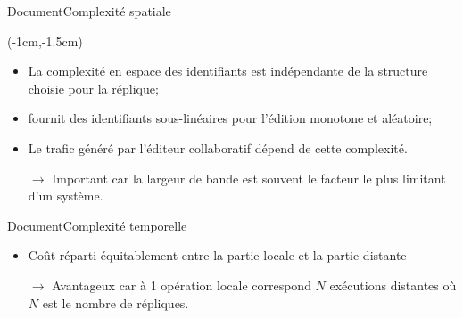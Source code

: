 \begin{frame}{Document}{Complexité spatiale}
  \vspace{1cm}
  
  \begin{textblock*}{\textwidth}(-1cm,-1.5cm) 
    \begin{table}[H]
      
    \end{table}
  \end{textblock*}
  
  \vspace{2cm}
  
  \begin{itemize}
  \item La complexité en espace des identifiants est indépendante de la
    structure choisie pour la réplique;
  \item \LSEQ fournit des identifiants sous-linéaires pour l'édition monotone
    et aléatoire;
  \item Le trafic généré par l'éditeur collaboratif dépend de cette complexité.
  \item [$\rightarrow$] Important car la largeur de bande est souvent le facteur
    le plus limitant d'un système.
  \end{itemize}
  
  
\end{frame}


\begin{frame}{Document}{Complexité temporelle}

  \begin{center}
    
  \end{center}
  
  \vspace{0.5cm}
  
  \begin{itemize}
  \item Coût réparti équitablement entre la partie locale et la partie distante
  \item [$\rightarrow$] Avantageux car à 1 opération locale correspond $N$
    exécutions distantes où $N$ est le nombre de répliques.
  \end{itemize}
  
\end{frame}

